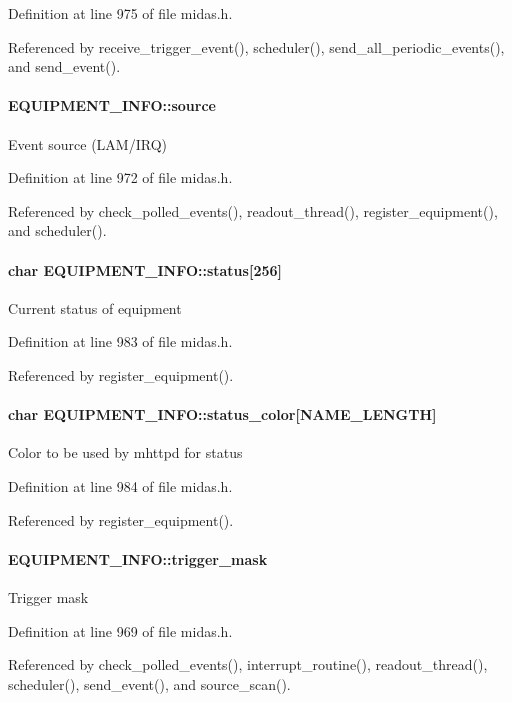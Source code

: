 Definition at line 975 of file midas.h.

Referenced by receive\_\-trigger\_\-event(), scheduler(), send\_\-all\_\-periodic\_\-events(), and send\_\-event().
\paragraph[{source}]{ {\bf EQUIPMENT\_\-INFO::source}}\hfill\label{structEQUIPMENT__INFO_a345e65d8874f6b968bedc00e76d4f431}
Event source (LAM/IRQ) 

Definition at line 972 of file midas.h.

Referenced by check\_\-polled\_\-events(), readout\_\-thread(), register\_\-equipment(), and scheduler().
\paragraph[{status}]{\setlength{\rightskip}{0pt plus 5cm}char {\bf EQUIPMENT\_\-INFO::status}\mbox{[}256\mbox{]}}\hfill\label{structEQUIPMENT__INFO_a0c629c9353558e8f2f1759357608ebb6}
Current status of equipment 

Definition at line 983 of file midas.h.

Referenced by register\_\-equipment().
\paragraph[{status\_\-color}]{\setlength{\rightskip}{0pt plus 5cm}char {\bf EQUIPMENT\_\-INFO::status\_\-color}\mbox{[}NAME\_\-LENGTH\mbox{]}}\hfill\label{structEQUIPMENT__INFO_acfbe0f2e23fe95a1a06d55d6e0d3ac9c}
Color to be used by mhttpd for status 

Definition at line 984 of file midas.h.

Referenced by register\_\-equipment().
\paragraph[{trigger\_\-mask}]{ {\bf EQUIPMENT\_\-INFO::trigger\_\-mask}}\hfill\label{structEQUIPMENT__INFO_a5744b359b07fc1963dd1a88210d28e6b}
Trigger mask 

Definition at line 969 of file midas.h.

Referenced by check\_\-polled\_\-events(), interrupt\_\-routine(), readout\_\-thread(), scheduler(), send\_\-event(), and source\_\-scan().